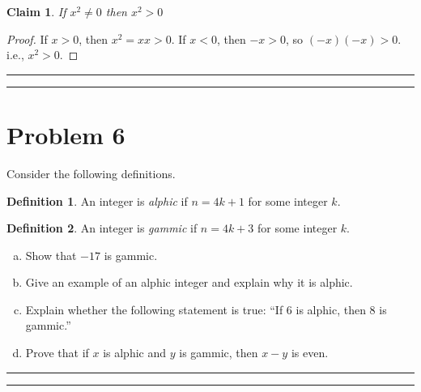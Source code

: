 \documentclass{article}
\newtheorem*{claim}{Claim} %
\theoremstyle{definition}
\newtheorem*{definition}{Definition} %
\newenvironment{solution}{\bigskip\hrule{\hfill}}{\bigskip\hrule{\hfill}} %
\begin{document}
\begin{claim}
    If $x^2\neq0$ then $x^2>0$
\end{claim}
\begin{proof}
    If $x>0$, then $x^2=xx>0$. If $x<0$, then $-x>0$, so $\left(-x\right)\left(-x\right)>0$. i.e., $x^2>0$.
\end{proof}
\begin{solution}


\end{solution}


\newpage


\section*{Problem 6}

Consider the following definitions.

\begin{definition}
    An integer is \emph{alphic} if $n=4k+1$ for some integer $k$. 
\end{definition}
\begin{definition}
    An integer is \emph{gammic} if $n=4k+3$ for some integer $k$.
\end{definition}

\begin{enumerate}[a)] %
    \item Show that $-17$ is gammic.

    \item Give an example of an alphic integer and explain why it is alphic.

    \item Explain whether the following statement is true: ``If $6$ is alphic, then $8$ is gammic.''

    \item Prove that if $x$ is alphic and $y$ is gammic, then $x-y$ is even.
\end{enumerate}

\begin{solution}


\end{solution}
\end{document}
